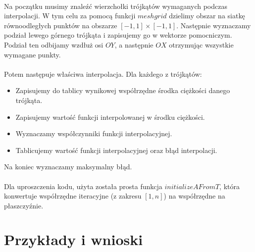 \documentclass{article}
\begin{document}
\paragraph{}
Na początku musimy znaleźć wierzchołki trójkątów wymaganych podczas interpolacji. W tym celu za pomocą funkcji $meshgrid$ dzielimy obszar na siatkę równoodległych punktów na obszarze $[-1,1]\times[-1,1]$. Następnie wyznaczamy podział lewego górnego trójkąta i zapisujemy go w wektorze pomocniczym. Podział ten odbijamy wzdłuż osi $OY$, a następnie $OX$ otrzymując wszystkie wymagane punkty.
\paragraph{}
Potem następuje właściwa interpolacja. Dla każdego z trójkątów:
\begin{itemize}
\item Zapisujemy do tablicy wynikowej współrzędne środka ciężkości danego trójkąta.
\item Zapisujemy wartość funkcji interpolowanej w środku ciężkości.
\item Wyznaczamy współczynniki funkcji interpolacyjnej.
\item Tablicujemy wartość funkcji interpolacyjnej oraz błąd interpolacji.
\end{itemize}
Na koniec wyznaczamy maksymalny błąd.
\paragraph{}
Dla uproszczenia kodu, użyta została prosta funkcja $initializeAFromT$, która konwertuje współrzędne iteracyjne (z zakresu $[1,n]$) na współrzędne na płaszczyźnie.
\section{Przykłady i wnioski}
\end{document}

